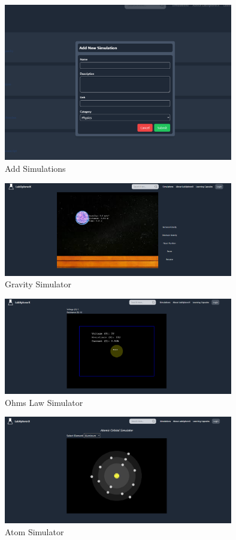  \begin{figure}[H]
    \centering
     \includegraphics[width = 10cm]{Diagrams/output/addsimulations.png}
     \caption{Add Simulations}
 \end{figure}

 \begin{figure}[H]
    \centering
     \includegraphics[width = 10cm]{Diagrams/output/gravity.png}
     \caption{Gravity Simulator}
 \end{figure}

 \begin{figure}[H]
    \centering
     \includegraphics[width = 10cm]{Diagrams/output/ohms.png}
     \caption{Ohms Law Simulator}
 \end{figure}

 \begin{figure}[H]
    \centering
     \includegraphics[width = 10cm]{Diagrams/output/atom.png}
     \caption{Atom Simulator}
 \end{figure}

